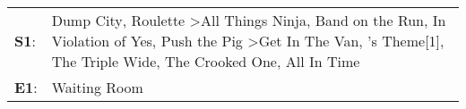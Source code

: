 \begin{supertabular}{p{0.03\textwidth}p{0.92\textwidth}}
 \textbf{S1}:  &  Dump City\textsuperscript{}, \enspace Roulette\textsuperscript{} \textgreater \enspace All Things Ninja\textsuperscript{}, \enspace Band on the Run\textsuperscript{}, \enspace In Violation of Yes\textsuperscript{}, \enspace Push the Pig\textsuperscript{} \textgreater \enspace Get In The Van\textsuperscript{}, 's Theme[1]\textsuperscript{}, \enspace The Triple Wide\textsuperscript{}, \enspace The Crooked One\textsuperscript{}, \enspace All In Time\textsuperscript{}  \enspace  \\
 \textbf{E1}:  &                                                                                                                                                                                                                                                                                                                                                                                                                                                                   Waiting Room\textsuperscript{}  \enspace  \\
\end{supertabular}
